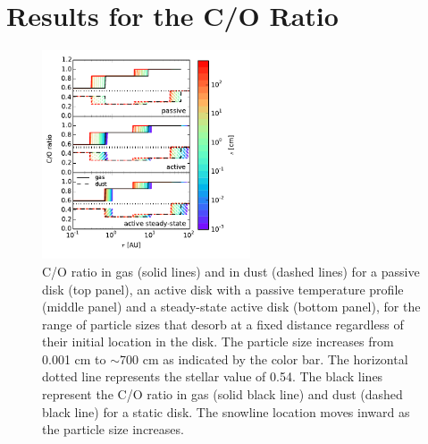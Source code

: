 \documentclass[apj]{emulateapj}
\newcommand{\emgr}[1]{\emph{ \color{gray} #1}}
\begin{document}


\section{Results for the C/O Ratio}
\label{sec:COratio}

\begin{figure}[h!]
\centering
\includegraphics[width=0.55\textwidth]{../../figs/C_O_ratio_passive_active_disk_many_colorbar_complete.pdf}
\caption{C/O ratio in gas (solid lines) and in dust (dashed lines) for a passive disk (top panel), an active disk with a passive temperature profile (middle panel) and a steady-state active disk (bottom panel), for the range of particle sizes that desorb at a fixed distance regardless of their initial location in the disk. The particle size increases from 0.001 cm to $\sim$700 cm as indicated by the color bar. The horizontal dotted line represents the stellar value of 0.54. The black lines represent the C/O ratio in gas (solid black line) and dust (dashed black line) for a static disk. The snowline location moves inward as the particle size increases.}
\label{fig:CO_ratio}
\end{figure}
\end{document}
